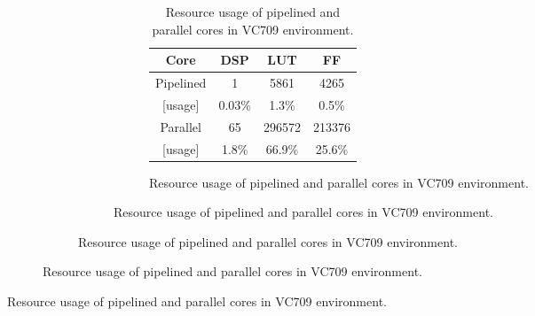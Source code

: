 \begin{figure}[!tb]
\begin{figure}[!tb]
\begin{figure}[!tb]
\begin{figure}[!tb]
\begin{figure}[!tb]
  \ifCLASSOPTIONcompsoc
    \begin{table}[!tb]
  \else
    \begin{table}[!t]
  \fi
    \caption{Resource usage of pipelined and parallel cores in VC709 environment.}
    \centering
    \label{tab:ru}
    \begin{tabular}{|c|c|c|c|}\hline
      Core       & DSP    & LUT    & FF     \\\hline
      Pipelined  & 1      & 5861   & 4265   \\\cline{2-4}
      [usage]    & 0.03\% & 1.3\%  & 0.5\%  \\\hline
      Parallel   & 65     & 296572 & 213376 \\\cline{2-4}
      [usage]    & 1.8\%  & 66.9\% & 25.6\% \\\hline
    \end{tabular}
  \end{table}


\end{table}
\end{figure}
\end{figure}
\end{figure}
\end{figure}
\end{figure}
